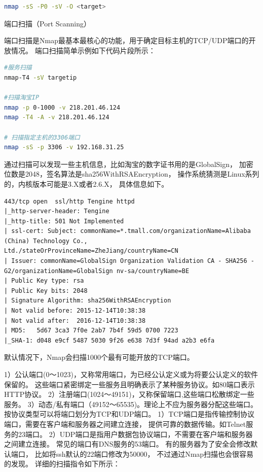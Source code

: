 \documentclass[11pt,fleqn]{book}
\makeatletter
\numberwithin{dummy}{section}
\theoremstyle{ocrenumbox}
\theoremstyle{blacknumex}
\theoremstyle{blacknumbox}
\theoremstyle{ocrenum}
\renewcommand{\subsection}{\@startsection {subsection}{2}{\z@}
	{-3ex \@plus -0.1ex \@minus -.4ex}
	{0.5ex \@plus.2ex }
	{\normalfont\sffamily\bfseries}}
\makeatother
\begin{document}
\begin{lstlisting}[language=Bash]
nmap -sS -P0 -sV -O <target>
\end{lstlisting}

\subsection{端口扫描（Port Scanning）}

端口扫描是Nmap最基本最核心的功能，用于确定目标主机的TCP/UDP端口的开放情况。
端口扫描简单示例如下代码片段所示：

\begin{lstlisting}[language=Bash]
#服务扫描
nmap-T4 -sV targetip 

#扫描淘宝IP
nmap -p 0-1000 -v 218.201.46.124
nmap -T4 -A -v 218.201.46.124

# 扫描指定主机的3306端口
nmap -sS -p 3306 -v 192.168.31.25
\end{lstlisting}

通过扫描可以发现一些主机信息，比如淘宝的数字证书用的是GlobalSign，
加密位数是2048，签名算法是sha256WithRSAEncryption，
操作系统猜测是Linux系列的，内核版本可能是3.X或者2.6.X，
具体信息如下。

\begin{lstlisting}
443/tcp open  ssl/http Tengine httpd
|_http-server-header: Tengine
|_http-title: 501 Not Implemented
| ssl-cert: Subject: commonName=*.tmall.com/organizationName=Alibaba (China) Technology Co., Ltd./stateOrProvinceName=ZheJiang/countryName=CN
| Issuer: commonName=GlobalSign Organization Validation CA - SHA256 - G2/organizationName=GlobalSign nv-sa/countryName=BE
| Public Key type: rsa
| Public Key bits: 2048
| Signature Algorithm: sha256WithRSAEncryption
| Not valid before: 2015-12-14T10:38:38
| Not valid after:  2016-12-14T10:38:38
| MD5:   5d67 3ca3 7f0e 2ab7 7b4f 59d5 0700 7223
|_SHA-1: d048 e9cf 5487 5030 9f26 e638 7d3f 94ad a2b3 e6fa
\end{lstlisting}

默认情况下，Nmap会扫描1000个最有可能开放的TCP端口。

1）公认端口(0～1023)，又称常用端口，为已经公认定义或为将要公认定义的软件保留的。
这些端口紧密绑定一些服务且明确表示了某种服务协议。如80端口表示HTTP协议。
2）注册端口(1024～49151)，又称保留端口,这些端口松散绑定一些服务。
3）动态/私有端口（49152～65535)。理论上不应为服务器分配这些端口。
按协议类型可以将端口划分为TCP和UDP端口。
1）TCP端口是指传输控制协议端口，需要在客户端和服务器之间建立连接，
提供可靠的数据传输。如Telnet服务的23端口。
2）UDP端口是指用户数据包协议端口，不需要在客户端和服务器之间建立连接。
常见的端口有DNS服务的53端口。
有的服务器为了安全会修改默认端口，
比如将ssh默认的22端口修改为50000，
不过通过Nmap扫描也会很容易的发现。
详细的扫描指令如下所示：
\end{document}
